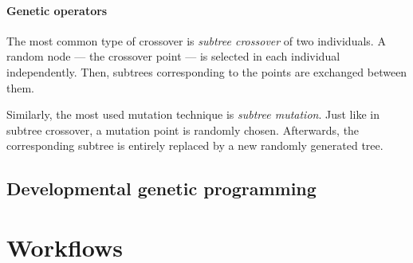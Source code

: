 \paragraph{Genetic operators}
The most common type of crossover is \emph{subtree crossover} of two
individuals. A random node --- the crossover point ---
is selected in each individual independently. Then, subtrees corresponding
to the points are exchanged between them.

Similarly, the most used mutation technique is \emph{subtree mutation}.
Just like in subtree crossover, a mutation point is randomly chosen.
Afterwards, the corresponding subtree is entirely replaced by a new randomly
generated tree.

\subsection{Developmental genetic programming}

\section{Workflows}